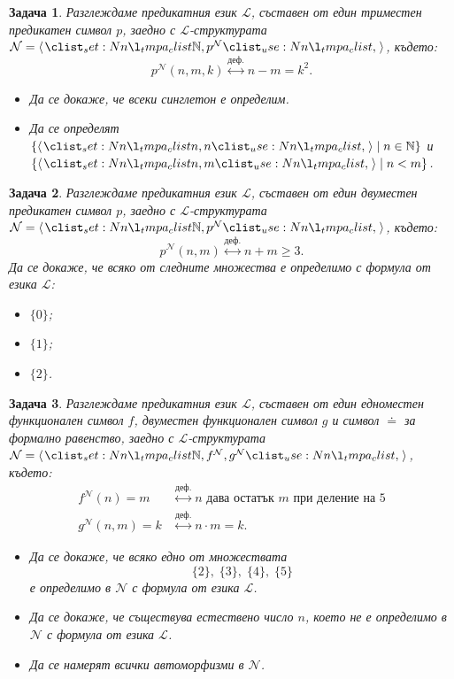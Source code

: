 \documentclass[12pt]{article}
\newcommand{\N}{\mathbb{N}}
\newcommand{\calL}{\mathcal{L}}
\newcommand{\calN}{\mathcal{N}}
\newcommand{\dequiv}{\stackrel{\text{деф.}}{\longleftrightarrow}}
\newtheorem{problem}{Задача}[section]
\theoremstyle{definition}
\begin{document}
\begin{problem}
Разглеждаме предикатния език $\calL$, съставен от един триместен предикатен символ $p$, заедно с $\calL$-структурата $\calN = \opair{\N, p^{\calN}}$, където:
\[
    p^{\calN}(n, m, k) \dequiv n - m = k^2.
\]
\begin{itemize}
    \item[а)] Да се докаже, че всеки синглетон е определим.
    \item[б)] Да се определят $\{ \opair{n, n} \mid n \in \N \}$ и $\{ \opair{n, m} \mid n < m \}$.
\end{itemize}
\end{problem}
\begin{problem}
Разглеждаме предикатния език $\calL$, съставен от един двуместен предикатен символ $p$, заедно с $\calL$-структурата $\calN = \opair{\N, p^{\calN}}$, където:
\[
    p^{\calN}(n, m) \dequiv n + m \geq 3.
\]
Да се докаже, че всяко от следните множества е определимо с формула от езика $\calL$:
\begin{itemize}
    \item[а)] $\{ 0 \}$;
    \item[б)] $\{ 1 \}$;
    \item[в)] $\{ 2 \}$.
\end{itemize}
\end{problem}

\begin{problem}
Разглеждаме предикатния език $\calL$, съставен от един едноместен функционален символ $f$, двуместен функционален символ $g$ и символ $\doteq$ за формално равенство, заедно с $\calL$-структурата $\calN = \opair{\N, f^{\calN}, g^{\calN}}$, където:
\begin{align*}
    f^{\calN}(n) = m    & \dequiv n \text{ дава остатък } m \text{ при деление на } 5 \\
    g^{\calN}(n, m) = k & \dequiv n \cdot m = k.
\end{align*}
\begin{itemize}
    \item[а)] Да се докаже, че всяко едно от множествата \[ \{ 2 \}, \; \{ 3 \}, \; \{ 4 \}, \; \{ 5 \} \] е определимо в $\calN$ с формула от езика $\calL$.
    \item[б)] Да се докаже, че съществува естествено число $n$, което не е определимо в $\calN$ с формула от езика $\calL$.
    \item[в)] Да се намерят всички автоморфизми в $\calN$.
\end{itemize}
\end{problem}
\end{document}
